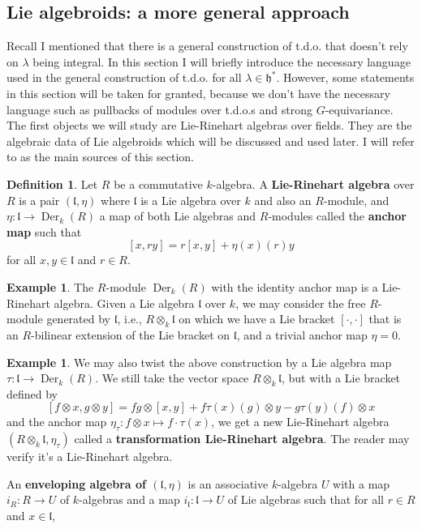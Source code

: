 \documentclass[11pt, a4paper]{article}
\theoremstyle{definition}
\newtheorem{example}[theorem]{Example}
\newtheorem{definition}[theorem]{Definition}
\newcommand{\h}{\mathfrak h}
\newcommand{\Der}{\operatorname{Der}}
\begin{document}
    \subsection{Lie algebroids: a more general approach}
    \label{sec-lie-algebroid}
    Recall I mentioned that there is a general construction of t.d.o. that doesn't rely on $\lambda$ being integral. In this section I will briefly introduce the necessary language used in the general construction of t.d.o. for all $\lambda\in\h^*$. However, some statements in this section will be taken for granted, because we don't have the necessary language such as pullbacks of modules over t.d.o.s and strong $G$-equivariance. The first objects we will study are Lie-Rinehart algebras over fields. They are the algebraic data of Lie algebroids which will be discussed and used later. I will refer to \cite{wadsley-d-modules-I, bekaert-lie-rinehart} as the main sources of this section.
    \renewcommand{\l}{\mathfrak l}
    \begin{definition}
        Let $R$ be a commutative $k$-algebra. A \textbf{Lie-Rinehart algebra} over $R$ is a pair $(\l, \eta)$ where $\l$ is a Lie algebra over $k$ and also an $R$-module, and $\eta:\l\to\Der_k(R)$ a map of both Lie algebras and $R$-modules called the \textbf{anchor map} such that
        \[[x, ry]=r[x, y]+\eta(x)(r)y\]
        for all $x, y\in \l$ and $r\in R$.
    \end{definition}
    \begin{example}
        The $R$-module $\Der_k(R)$ with the identity anchor map is a Lie-Rinehart algebra. Given a Lie algebra $\l$ over $k$, we may consider the free $R$-module generated by $\l$, i.e., $R\otimes_k\l$ on which we have a Lie bracket $[\cdot, \cdot]$ that is an $R$-bilinear extension of the Lie bracket on $\l$, and a trivial anchor map $\eta=0$.
    \end{example}
    \begin{example}\label{exp-twist-lie-rinehart}
        We may also twist the above construction by a Lie algebra map $\tau:\l\to\Der_k(R)$. We still take the vector space $R\otimes_k\l$, but with a Lie bracket defined by
        \[[f\otimes x, g\otimes y]=fg\otimes[x, y]+f\tau(x)(g)\otimes y-g\tau(y)(f)\otimes x\]
        and the anchor map $\eta_{\tau}:f\otimes x\mapsto f\cdot \tau(x)$, we get a new Lie-Rinehart algebra $(R\otimes_k\l, \eta_{\tau})$ called a \textbf{transformation Lie-Rinehart algebra}. The reader may verify it's a Lie-Rinehart algebra.
    \end{example}
    An \textbf{enveloping algebra of $(\l, \eta)$} is an associative $k$-algebra $U$ with a map $i_R:R\to U$ of $k$-algebras and a map $i_\l:\l\to U$ of Lie algebras such that for all $r\in R$ and $x\in \l$,
\end{document}
